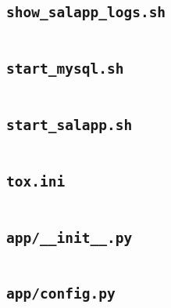 \subsection{\texttt{show\_salapp\_logs.sh}}
\begin{codelisting}
\label{fcl:uswacs-2-iy2d502-salapp:show_salapp_logs.sh}
\inputminted[breakanywhere]{bash}{../uswacs-2-iy2d502-salapp/show_salapp_logs.sh}\end{codelisting}
\subsection{\texttt{start\_mysql.sh}}
\begin{codelisting}
\label{fcl:uswacs-2-iy2d502-salapp:start_mysql.sh}
\inputminted[breakanywhere]{bash}{../uswacs-2-iy2d502-salapp/start_mysql.sh}\end{codelisting}
\subsection{\texttt{start\_salapp.sh}}
\begin{codelisting}
\label{fcl:uswacs-2-iy2d502-salapp:start_salapp.sh}
\inputminted[breakanywhere]{bash}{../uswacs-2-iy2d502-salapp/start_salapp.sh}\end{codelisting}
\subsection{\texttt{tox.ini}}
\begin{codelisting}
\label{fcl:uswacs-2-iy2d502-salapp:tox.ini}
\inputminted[breakanywhere]{text}{../uswacs-2-iy2d502-salapp/tox.ini}\end{codelisting}
\subsection{\texttt{app/\_\_init\_\_.py}}
\begin{codelisting}
\label{fcl:uswacs-2-iy2d502-salapp:__init__.py}
\inputminted[breakanywhere]{python3}{../uswacs-2-iy2d502-salapp/app/__init__.py}\end{codelisting}
\subsection{\texttt{app/config.py}}
\begin{codelisting}
\label{fcl:uswacs-2-iy2d502-salapp:config.py}
\inputminted[breakanywhere]{python3}{../uswacs-2-iy2d502-salapp/app/config.py}\end{codelisting}

